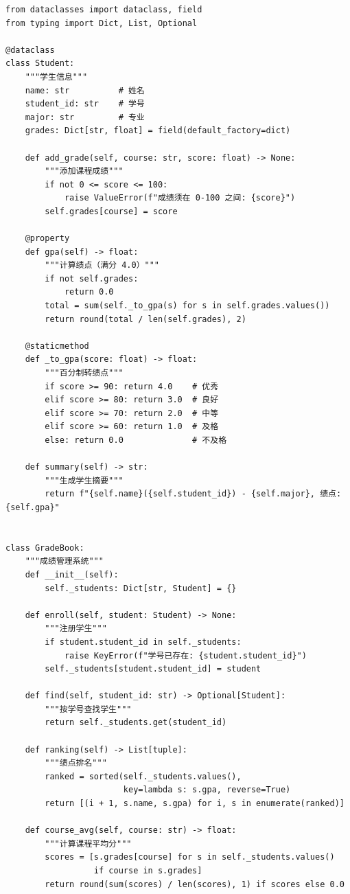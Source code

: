 \makeatletter
\begin{longlisting}
\iftongjithesis@minted
\begin{verbatim}
from dataclasses import dataclass, field
from typing import Dict, List, Optional

@dataclass
class Student:
    """学生信息"""
    name: str          # 姓名
    student_id: str    # 学号
    major: str         # 专业
    grades: Dict[str, float] = field(default_factory=dict)

    def add_grade(self, course: str, score: float) -> None:
        """添加课程成绩"""
        if not 0 <= score <= 100:
            raise ValueError(f"成绩须在 0-100 之间: {score}")
        self.grades[course] = score

    @property
    def gpa(self) -> float:
        """计算绩点（满分 4.0）"""
        if not self.grades:
            return 0.0
        total = sum(self._to_gpa(s) for s in self.grades.values())
        return round(total / len(self.grades), 2)

    @staticmethod
    def _to_gpa(score: float) -> float:
        """百分制转绩点"""
        if score >= 90: return 4.0    # 优秀
        elif score >= 80: return 3.0  # 良好
        elif score >= 70: return 2.0  # 中等
        elif score >= 60: return 1.0  # 及格
        else: return 0.0              # 不及格

    def summary(self) -> str:
        """生成学生摘要"""
        return f"{self.name}({self.student_id}) - {self.major}, 绩点: {self.gpa}"


class GradeBook:
    """成绩管理系统"""
    def __init__(self):
        self._students: Dict[str, Student] = {}

    def enroll(self, student: Student) -> None:
        """注册学生"""
        if student.student_id in self._students:
            raise KeyError(f"学号已存在: {student.student_id}")
        self._students[student.student_id] = student

    def find(self, student_id: str) -> Optional[Student]:
        """按学号查找学生"""
        return self._students.get(student_id)

    def ranking(self) -> List[tuple]:
        """绩点排名"""
        ranked = sorted(self._students.values(),
                        key=lambda s: s.gpa, reverse=True)
        return [(i + 1, s.name, s.gpa) for i, s in enumerate(ranked)]

    def course_avg(self, course: str) -> float:
        """计算课程平均分"""
        scores = [s.grades[course] for s in self._students.values()
                  if course in s.grades]
        return round(sum(scores) / len(scores), 1) if scores else 0.0



\end{verbatim}
\end{longlisting}
